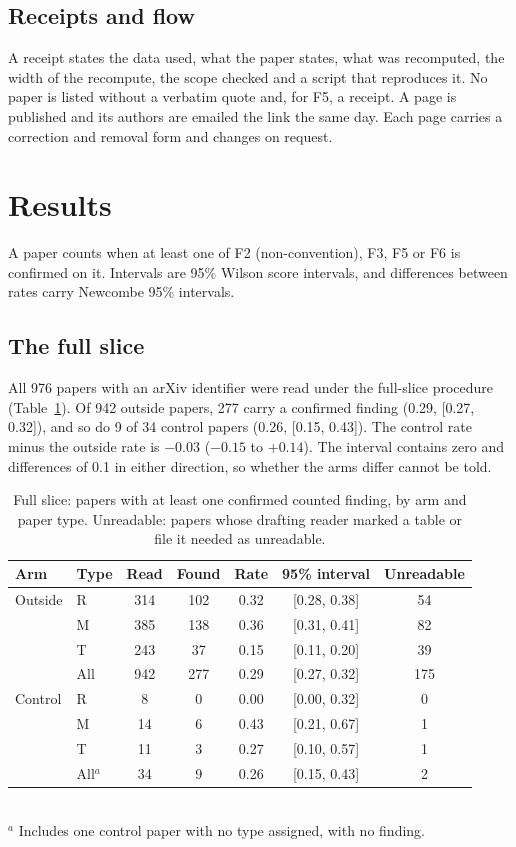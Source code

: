 \documentclass[reprint,amsmath,amssymb,aps,superscriptaddress,nofootinbib]{revtex4-2}
\begin{document}
\subsection{Receipts and flow}

A receipt states the data used, what the paper states, what was recomputed, the width of the recompute, the scope checked and a script that reproduces it. No paper is listed without a verbatim quote and, for F5, a receipt. A page is published and its authors are emailed the link the same day. Each page carries a correction and removal form and changes on request.

\section{Results}

A paper counts when at least one of F2 (non-convention), F3, F5 or F6 is confirmed on it. Intervals are 95\% Wilson score intervals, and differences between rates carry Newcombe 95\% intervals.

\subsection{The full slice}
\label{sec:full}

All 976 papers with an arXiv identifier were read under the full-slice procedure (Table~\ref{tab:full}). Of 942 outside papers, 277 carry a confirmed finding (0.29, [0.27, 0.32]), and so do 9 of 34 control papers (0.26, [0.15, 0.43]). The control rate minus the outside rate is $-0.03$ ($-0.15$ to $+0.14$). The interval contains zero and differences of 0.1 in either direction, so whether the arms differ cannot be told.

\begin{table}[t]
\caption{Full slice: papers with at least one confirmed counted finding, by arm and paper type. Unreadable: papers whose drafting reader marked a table or file it needed as unreadable.}
\label{tab:full}
\centering\small\setlength{\tabcolsep}{2pt}
\begin{tabular}{llccccc}
\hline\hline
Arm & Type & Read & Found & Rate & 95\% interval & Unreadable \\ \hline
Outside & R & 314 & 102 & 0.32 & [0.28, 0.38] & 54 \\
 & M & 385 & 138 & 0.36 & [0.31, 0.41] & 82 \\
 & T & 243 & 37 & 0.15 & [0.11, 0.20] & 39 \\
 & All & 942 & 277 & 0.29 & [0.27, 0.32] & 175 \\ \hline
Control & R & 8 & 0 & 0.00 & [0.00, 0.32] & 0 \\
 & M & 14 & 6 & 0.43 & [0.21, 0.67] & 1 \\
 & T & 11 & 3 & 0.27 & [0.10, 0.57] & 1 \\
 & All$^a$ & 34 & 9 & 0.26 & [0.15, 0.43] & 2 \\
\hline\hline
\end{tabular}
\\[2pt]{\footnotesize $^a$ Includes one control paper with no type assigned, with no finding.}
\end{table}
\end{document}
